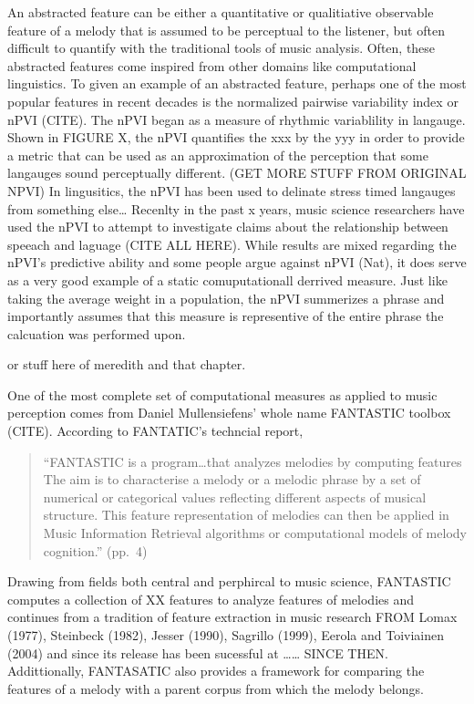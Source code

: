 \documentclass[]{book}
\begin{document}
An abstracted feature can be either a quantitative or qualitiative observable feature of a melody that is assumed to be perceptual to the listener, but often difficult to quantify with the traditional tools of music analysis.
Often, these abstracted features come inspired from other domains like computational linguistics.
To given an example of an abstracted feature, perhaps one of the most popular features in recent decades is the normalized pairwise variability index or nPVI (CITE).
The nPVI began as a measure of rhythmic variablility in langauge.
Shown in FIGURE X, the nPVI quantifies the xxx by the yyy in order to provide a metric that can be used as an approximation of the perception that some langauges sound perceptually different. (GET MORE STUFF FROM ORIGINAL NPVI)
In lingusitics, the nPVI has been used to delinate stress timed langauges from something else\ldots{}
Recenlty in the past x years, music science researchers have used the nPVI to attempt to investigate claims about the relationship between speeach and laguage (CITE ALL HERE).
While results are mixed regarding the nPVI's predictive ability and some people argue against nPVI (Nat), it does serve as a very good example of a static comuputationall derrived measure.
Just like taking the average weight in a population, the nPVI summerizes a phrase and importantly assumes that this measure is representive of the entire phrase the calcuation was performed upon.

or stuff here of meredith and that chapter.

One of the most complete set of computational measures as applied to music perception comes from Daniel Mullensiefens' whole name FANTASTIC toolbox (CITE).
According to FANTATIC's techncial report,

\begin{quote}
``FANTASTIC is a program\ldots{}that analyzes melodies by computing features The aim is to characterise a melody or a melodic phrase by a set of numerical or categorical values reflecting different aspects of musical structure. This feature representation of melodies can then be applied in Music Information Retrieval algorithms or computational
models of melody cognition.'' (pp.~4)
\end{quote}

Drawing from fields both central and perphircal to music science, FANTASTIC computes a collection of XX features to analyze features of melodies and continues from a tradition of feature extraction in music research FROM Lomax (1977), Steinbeck (1982), Jesser (1990), Sagrillo (1999), Eerola and Toiviainen (2004) and since its release has been sucessful at \ldots{}\ldots{} SINCE THEN.
Addittionally, FANTASATIC also provides a framework for comparing the features of a melody with a parent corpus from which the melody belongs.
\end{document}
